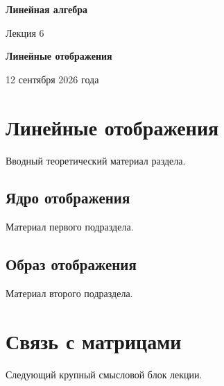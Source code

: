 \documentclass[a4paper,12pt]{article}
\begin{document}
\begin{center}
    {\Large\bfseries Линейная алгебра}

    \vspace{0.3em}

    {\large Лекция 6}

    \vspace{0.3em}

    \textbf{Линейные отображения}

    \vspace{0.3em}

    {\small 12 сентября 2026 года}
\end{center}

\vspace{1em}

\section{Линейные отображения}

Вводный теоретический материал раздела.

\subsection{Ядро отображения}

Материал первого подраздела.


\subsection{Образ отображения}

Материал второго подраздела.

\section{Связь с матрицами}

Следующий крупный смысловой блок лекции.
\end{document}
